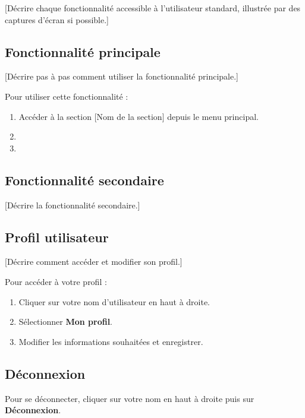 \documentclass[12pt, a4paper]{article}
\begin{document}
[Décrire chaque fonctionnalité accessible à l'utilisateur standard, illustrée
par des captures d'écran si possible.]

\subsection{Fonctionnalité principale}

[Décrire pas à pas comment utiliser la fonctionnalité principale.]

Pour utiliser cette fonctionnalité :
\begin{enumerate}
  \item Accéder à la section [Nom de la section] depuis le menu principal.
  \item [Étape 2]
  \item [Étape 3]
\end{enumerate}

\begin{remarque}
\end{remarque}

\subsection{Fonctionnalité secondaire}

[Décrire la fonctionnalité secondaire.]

\subsection{Profil utilisateur}

[Décrire comment accéder et modifier son profil.]

Pour accéder à votre profil :
\begin{enumerate}
  \item Cliquer sur votre nom d'utilisateur en haut à droite.
  \item Sélectionner \textbf{Mon profil}.
  \item Modifier les informations souhaitées et enregistrer.
\end{enumerate}

\subsection{Déconnexion}

Pour se déconnecter, cliquer sur votre nom en haut à droite puis sur
\textbf{Déconnexion}.
\end{document}
